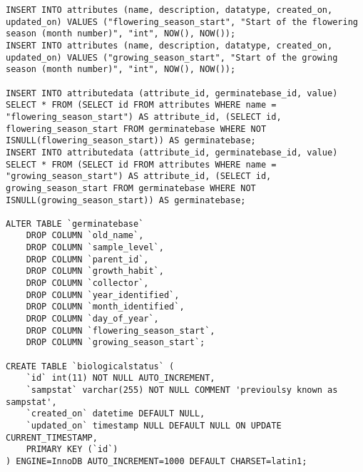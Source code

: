 \begin{itemize}
\begin{lstlisting}[style=SQL]
INSERT INTO attributes (name, description, datatype, created_on, updated_on) VALUES ("flowering_season_start", "Start of the flowering season (month number)", "int", NOW(), NOW());
INSERT INTO attributes (name, description, datatype, created_on, updated_on) VALUES ("growing_season_start", "Start of the growing season (month number)", "int", NOW(), NOW());

INSERT INTO attributedata (attribute_id, germinatebase_id, value) SELECT * FROM (SELECT id FROM attributes WHERE name = "flowering_season_start") AS attribute_id, (SELECT id, flowering_season_start FROM germinatebase WHERE NOT ISNULL(flowering_season_start)) AS germinatebase;
INSERT INTO attributedata (attribute_id, germinatebase_id, value) SELECT * FROM (SELECT id FROM attributes WHERE name = "growing_season_start") AS attribute_id, (SELECT id, growing_season_start FROM germinatebase WHERE NOT ISNULL(growing_season_start)) AS germinatebase;

ALTER TABLE `germinatebase`
	DROP COLUMN `old_name`,
	DROP COLUMN `sample_level`,
	DROP COLUMN `parent_id`,
	DROP COLUMN `growth_habit`,
	DROP COLUMN `collector`,
	DROP COLUMN `year_identified`,
	DROP COLUMN `month_identified`,
	DROP COLUMN `day_of_year`,
	DROP COLUMN `flowering_season_start`,
	DROP COLUMN `growing_season_start`;

CREATE TABLE `biologicalstatus` (
	`id` int(11) NOT NULL AUTO_INCREMENT,
	`sampstat` varchar(255) NOT NULL COMMENT 'previoulsy known as sampstat',
	`created_on` datetime DEFAULT NULL,
	`updated_on` timestamp NULL DEFAULT NULL ON UPDATE CURRENT_TIMESTAMP,
	PRIMARY KEY (`id`)
) ENGINE=InnoDB AUTO_INCREMENT=1000 DEFAULT CHARSET=latin1;


\end{lstlisting}
\end{itemize}

